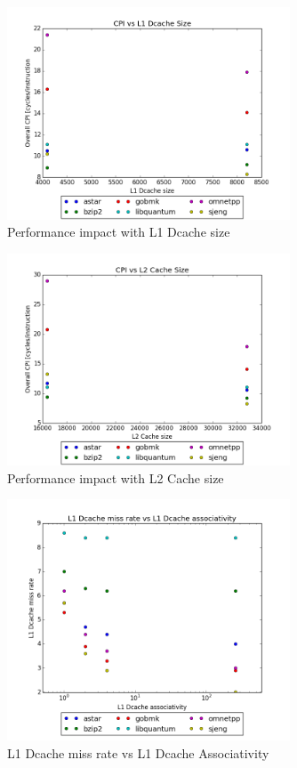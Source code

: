 \documentclass{article}
\begin{document}
\begin{figure}[ht]
    \centering
    \includegraphics[width=0.75\textwidth]{plots/CPI_vs_L1Dcache_size.png}
    \caption{Performance impact with L1 Dcache size}
    \label{fig:cpivsl1size}
\end{figure}

\begin{figure}[ht]
    \centering
    \includegraphics[width=0.75\textwidth]{plots/CPI_vs_L2Cache_size.png}
    \caption{Performance impact with L2 Cache size}
    \label{fig:cpivsl2size}
\end{figure}

\begin{figure}[ht]
    \centering
    \includegraphics[width=0.75\textwidth]{plots/L1Dcache_miss_vs_associativity.png}
    \caption{L1 Dcache miss rate vs L1 Dcache Associativity}
    \label{fig:l1missvsl1assoc}
\end{figure}
\end{document}

